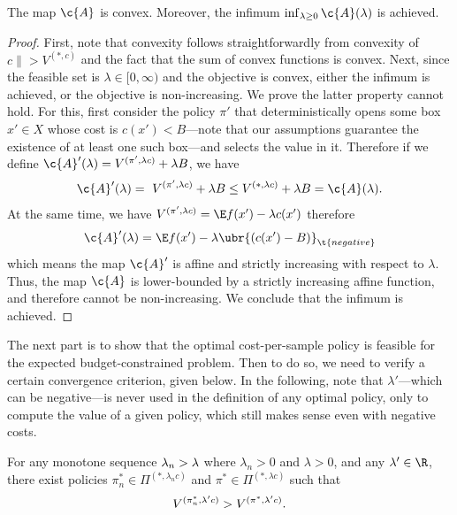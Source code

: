 \documentclass{article}
\begin{document}
\begin{lemma}
\label{lem:lambda_obj_properties}
The map $\c{A}$ is convex. 
Moreover, the infimum $\inf_{\lambda\geq0} \c{A}(\lambda)$ is achieved.
\end{lemma}

\begin{proof}
First, note that convexity follows straightforwardly from convexity of $c \|> V^{(*,c)}$ and the fact that the sum of convex functions is convex.
Next, since the feasible set is $\lambda \in [0,\infty)$ and the objective is convex, either the infimum is achieved, or the objective is non-increasing.
We prove the latter property cannot hold.
For this, first consider the policy $\pi'$ that deterministically opens some box $x'\in X$ whose cost is $c(x') < B$---note that our assumptions guarantee the existence of at least one such box---and selects the value in it.
Therefore if we define $\c{A}'(\lambda) = V^{(\pi', \lambda c)} + \lambda B$, we have 
\[
\c{A}'(\lambda) = ~V^{(\pi', \lambda c)} + \lambda B \leq V^{(*, \lambda c)} + \lambda B = \c{A}(\lambda)
.
\]
At the same time, we have $V^{(\pi', \lambda c)} = \E f(x') - \lambda c(x')$ therefore 
\[
    \c{A}'(\lambda) = \E f(x') - \lambda \ubr{(c(x') - B)}_{\t{negative}}
\]
which means the map $\c{A}'$ is affine and strictly increasing with respect to $\lambda$.
Thus, the map $\c{A}$ is lower-bounded by a strictly increasing affine function, and therefore cannot be non-increasing.
We conclude that the infimum is achieved.
\end{proof}

The next part is to show that the optimal cost-per-sample policy is feasible for the expected budget-constrained problem.
Then to do so, we need to verify a certain convergence criterion, given below.
In the following, note that $\lambda'$---which can be negative---is never used in the definition of any optimal policy, only to compute the value of a given policy, which still makes sense even with negative costs.

\begin{lemma}
\label{lem:conv}
For any monotone sequence $\lambda_n \-> \lambda$ where $\lambda_n > 0$ and $\lambda > 0$, and any $\lambda'\in\R$, there exist policies $\pi^*_n\in\Pi^{(*,\lambda_n c)}$ and $\pi^*\in\Pi^{(*,\lambda c)}$ such that
\[
V^{(\pi^*_n,\lambda' c)} \-> V^{(\pi^*, \lambda' c)}
.
\]
\end{lemma}
\end{document}
